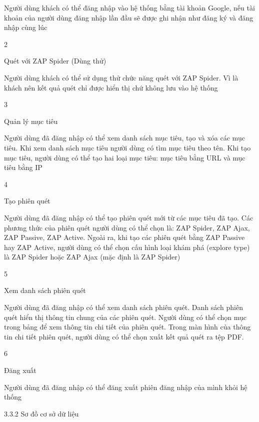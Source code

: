 Người dùng khách có thể đăng nhập vào hệ thống bằng tài khoản Google, nếu tài khoản của người dùng đăng nhập lần đầu sẽ được ghi nhận như đăng ký và đăng nhập cùng lúc

2

Quét với ZAP Spider (Dùng thử)

Người dùng khách có thể sử dụng thử chức năng quét với ZAP Spider. Vì là khách nên kết quả quét chỉ được hiển thị chứ không lưu vào hệ thống

3

Quản lý mục tiêu

Người dùng đã đăng nhập có thể xem danh sách mục tiêu, tạo và xóa các mục tiêu. Khi xem danh sách mục tiêu người dùng có tìm mục tiêu theo tên. Khi tạo mục tiêu, người dùng có thể tạo hai loại mục tiêu: mục tiêu bằng URL và mục tiêu bằng IP

4

Tạo phiên quét

Người dùng đã đăng nhập có thể tạo phiên quét mới từ các mục tiêu đã tạo. Các phương thức của phiên quét người dùng có thể chọn là: ZAP Spider, ZAP Ajax, ZAP Passive, ZAP Active. Ngoài ra, khi tạo các phiên quét bằng ZAP Passive hay ZAP Active, người dùng có thể chọn cấu hình loại khám phá (explore type) là ZAP Spider hoặc ZAP Ajax (mặc định là ZAP Spider)

5

Xem danh sách phiên quét

Người dùng đã đăng nhập có thể xem danh sách phiên quét. Danh sách phiên quét hiển thị thông tin chung của các phiên quét. Người dùng có thể chọn mục trong bảng để xem thông tin chi tiết của phiên quét. Trong màn hình của thông tin chi tiết phiên quét, người dùng có thể chọn xuất kết quả quét ra tệp PDF.

6

Đăng xuất

Người dùng đã đăng nhập có thể đăng xuất phiên đăng nhập của mình khỏi hệ thống

3.3.2 Sơ đồ cơ sở dữ liệu
